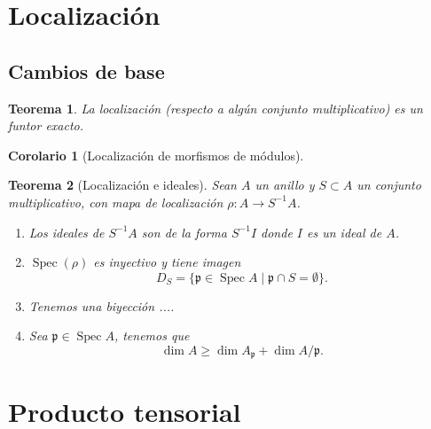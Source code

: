 \documentclass[12pt]{book}
\newtheorem{teo}{Teorema}
\newtheorem{cor}{Corolario}
\begin{document}
\section{Localización}

\subsection{Cambios de base}


\begin{teo}
	La localización (respecto a algún conjunto multiplicativo) es un funtor exacto.
\end{teo}

\begin{cor}[Localización de morfismos de módulos]
	
\end{cor}



\begin{teo}[Localización e ideales]
	Sean $A$ un anillo y $S\subset A$ un conjunto multiplicativo, con mapa de localización $\rho: A \rightarrow S^{-1}A$.
	\begin{enumerate}
		\item Los ideales de $S^{-1}A$ son de la forma $S^{-1}I$ donde $I $ es un ideal de $A$.
		\item $\operatorname{Spec}(\rho)$ es inyectivo y tiene imagen $$D_S = \{\mathfrak{p} \in \operatorname{Spec} A \; |\; \mathfrak{p} \cap S = \emptyset \}.$$ 
		\item Tenemos una biyección ....
		
		\item Sea $\mathfrak{p}\in \operatorname{Spec}A$, tenemos que $$ \dim A \geq \dim A_\mathfrak{p} + \dim A/\mathfrak{p}.  $$ 
		
	\end{enumerate}
\end{teo}










\section{Producto tensorial}
\end{document}
